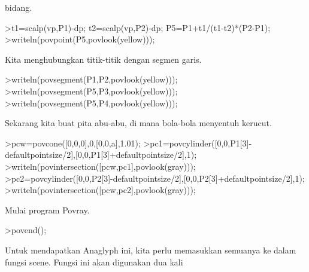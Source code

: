 \documentclass[a4paper,10pt]{article}
\begin{document}
\begin{eulernotebook}
\begin{eulercomment}
\begin{eulercomment}
\begin{eulercomment}
\begin{eulercomment}
\begin{eulercomment}
\begin{eulercomment}
\begin{eulercomment}
\begin{eulercomment}
\begin{eulercomment}
\begin{eulercomment}
\begin{eulercomment}
\begin{eulercomment}
\begin{eulercomment}
\begin{eulercomment}
\begin{eulercomment}
\begin{eulercomment}
\begin{eulercomment}
\begin{eulercomment}
\begin{eulercomment}
\begin{eulercomment}
\begin{eulercomment}
\begin{eulercomment}
\begin{eulercomment}
\begin{eulercomment}
\begin{eulercomment}
\begin{eulercomment}
\begin{eulercomment}
\begin{eulercomment}
\begin{eulercomment}
\begin{eulercomment}
\begin{eulercomment}
\begin{eulercomment}
\begin{eulercomment}
\begin{eulercomment}
\begin{eulercomment}
\begin{eulercomment}
\begin{eulercomment}
\begin{eulercomment}
\begin{eulercomment}
\begin{eulercomment}
\begin{eulercomment}
\begin{eulercomment}
\begin{eulercomment}
\begin{eulercomment}
\begin{eulercomment}
\begin{eulercomment}
\begin{eulercomment}
\begin{eulercomment}
\begin{eulercomment}
\begin{eulercomment}
\begin{eulercomment}
\begin{eulercomment}
\begin{eulercomment}
\begin{eulercomment}
\begin{eulercomment}
\begin{eulercomment}
\begin{eulercomment}
\begin{eulercomment}
\begin{eulercomment}
\begin{eulercomment}
\begin{eulercomment}
\begin{eulercomment}
\begin{eulercomment}
\begin{eulercomment}
\begin{eulercomment}
bidang.
\end{eulercomment}
\begin{eulerprompt}
>t1=scalp(vp,P1)-dp; t2=scalp(vp,P2)-dp; P5=P1+t1/(t1-t2)*(P2-P1);
>writeln(povpoint(P5,povlook(yellow)));
\end{eulerprompt}
\begin{eulercomment}
Kita menghubungkan titik-titik dengan segmen garis.
\end{eulercomment}
\begin{eulerprompt}
>writeln(povsegment(P1,P2,povlook(yellow)));
>writeln(povsegment(P5,P3,povlook(yellow)));
>writeln(povsegment(P5,P4,povlook(yellow)));
\end{eulerprompt}
\begin{eulercomment}
Sekarang kita buat pita abu-abu, di mana bola-bola menyentuh kerucut.
\end{eulercomment}
\begin{eulerprompt}
>pcw=povcone([0,0,0],0,[0,0,a],1.01);
>pc1=povcylinder([0,0,P1[3]-defaultpointsize/2],[0,0,P1[3]+defaultpointsize/2],1);
>writeln(povintersection([pcw,pc1],povlook(gray)));
>pc2=povcylinder([0,0,P2[3]-defaultpointsize/2],[0,0,P2[3]+defaultpointsize/2],1);
>writeln(povintersection([pcw,pc2],povlook(gray)));
\end{eulerprompt}
\begin{eulercomment}
Mulai program Povray.
\end{eulercomment}
\begin{eulerprompt}
>povend();
\end{eulerprompt}
\begin{eulercomment}
Untuk mendapatkan Anaglyph ini, kita perlu memasukkan semuanya ke
dalam fungsi scene. Fungsi ini akan digunakan dua kali 
\end{eulercomment}
\end{eulercomment}
\end{eulercomment}
\end{eulercomment}
\end{eulercomment}
\end{eulercomment}
\end{eulercomment}
\end{eulercomment}
\end{eulercomment}
\end{eulercomment}
\end{eulercomment}
\end{eulercomment}
\end{eulercomment}
\end{eulercomment}
\end{eulercomment}
\end{eulercomment}
\end{eulercomment}
\end{eulercomment}
\end{eulercomment}
\end{eulercomment}
\end{eulercomment}
\end{eulercomment}
\end{eulercomment}
\end{eulercomment}
\end{eulercomment}
\end{eulercomment}
\end{eulercomment}
\end{eulercomment}
\end{eulercomment}
\end{eulercomment}
\end{eulercomment}
\end{eulercomment}
\end{eulercomment}
\end{eulercomment}
\end{eulercomment}
\end{eulercomment}
\end{eulercomment}
\end{eulercomment}
\end{eulercomment}
\end{eulercomment}
\end{eulercomment}
\end{eulercomment}
\end{eulercomment}
\end{eulercomment}
\end{eulercomment}
\end{eulercomment}
\end{eulercomment}
\end{eulercomment}
\end{eulercomment}
\end{eulercomment}
\end{eulercomment}
\end{eulercomment}
\end{eulercomment}
\end{eulercomment}
\end{eulercomment}
\end{eulercomment}
\end{eulercomment}
\end{eulercomment}
\end{eulercomment}
\end{eulercomment}
\end{eulercomment}
\end{eulercomment}
\end{eulercomment}
\end{eulercomment}
\end{eulercomment}
\end{eulernotebook}
\end{document}
